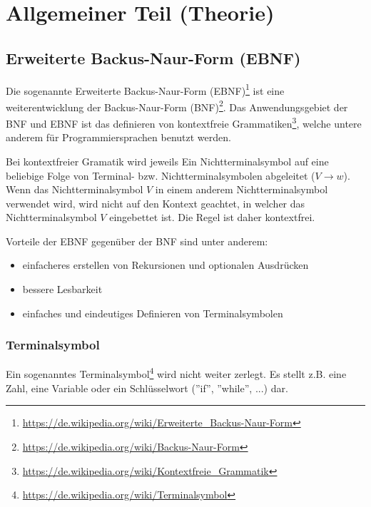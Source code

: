 

\section{Allgemeiner Teil (Theorie)}

\subsection{Erweiterte Backus-Naur-Form (EBNF)}

Die sogenannte Erweiterte Backus-Naur-Form (EBNF)\footnote{\url{https://de.wikipedia.org/wiki/Erweiterte_Backus-Naur-Form}} ist eine weiterentwicklung der Backus-Naur-Form (BNF)\footnote{\url{https://de.wikipedia.org/wiki/Backus-Naur-Form}}. Das Anwendungsgebiet der BNF und EBNF ist das definieren von  kontextfreie Grammatiken\footnote{\url{https://de.wikipedia.org/wiki/Kontextfreie_Grammatik}}, welche untere anderem f\"ur Programmiersprachen benutzt werden.

Bei kontextfreier Gramatik wird jeweils Ein Nichtterminalsymbol auf eine beliebige Folge von Terminal- bzw. Nichtterminalsymbolen abgeleitet ($V \rightarrow w$). Wenn das Nichtterminalsymbol $V$ in einem anderem Nichtterminalsymbol verwendet wird, wird nicht auf den Kontext geachtet, in welcher das Nichtterminalsymbol $V$ eingebettet ist. Die Regel ist daher kontextfrei.

Vorteile der EBNF gegen\"uber der BNF sind unter anderem:

\begin{itemize}
  \item einfacheres erstellen von Rekursionen und optionalen Ausdr\"ucken
  \item bessere Lesbarkeit
  \item einfaches und eindeutiges Definieren von Terminalsymbolen
\end{itemize}

\newpage

\subsubsection{Terminalsymbol}

Ein sogenanntes Terminalsymbol\footnote{\url{https://de.wikipedia.org/wiki/Terminalsymbol}} wird nicht weiter zerlegt. Es stellt z.B. eine Zahl, eine Variable oder ein Schlüsselwort (''if'', ''while'', ...) dar.

